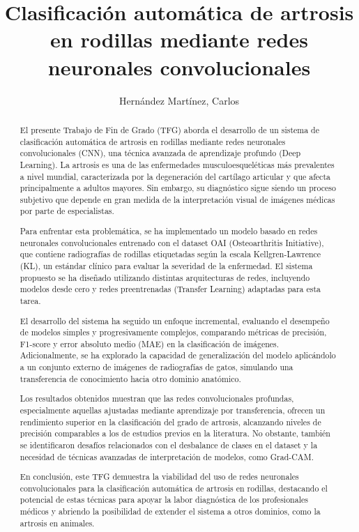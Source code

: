 \documentclass[11pt,spanish,listoffigures,listoftables]{tfgetsinf}
\title{Clasificación automática de artrosis en rodillas mediante redes neuronales convolucionales}
\author{Hernández Martínez, Carlos}
\begin{document}

\begin{abstract}

El presente Trabajo de Fin de Grado (TFG) aborda el desarrollo de un sistema de clasificación automática de artrosis en rodillas mediante redes neuronales convolucionales (CNN), una técnica avanzada de aprendizaje profundo (Deep Learning). La artrosis es una de las enfermedades musculoesqueléticas más prevalentes a nivel mundial, caracterizada por la degeneración del cartílago articular y que afecta principalmente a adultos mayores. Sin embargo, su diagnóstico sigue siendo un proceso subjetivo que depende en gran medida de la interpretación visual de imágenes médicas por parte de especialistas.

Para enfrentar esta problemática, se ha implementado un modelo basado en redes neuronales convolucionales entrenado con el dataset OAI (Osteoarthritis Initiative), que contiene radiografías de rodillas etiquetadas según la escala Kellgren-Lawrence (KL), un estándar clínico para evaluar la severidad de la enfermedad. El sistema propuesto se ha diseñado utilizando distintas arquitecturas de redes, incluyendo modelos desde cero y redes preentrenadas (Transfer Learning) adaptadas para esta tarea.

El desarrollo del sistema ha seguido un enfoque incremental, evaluando el desempeño de modelos simples y progresivamente complejos, comparando métricas de precisión, F1-score y error absoluto medio (MAE) en la clasificación de imágenes. Adicionalmente, se ha explorado la capacidad de generalización del modelo aplicándolo a un conjunto externo de imágenes de radiografías de gatos, simulando una transferencia de conocimiento hacia otro dominio anatómico.

Los resultados obtenidos muestran que las redes convolucionales profundas, especialmente aquellas ajustadas mediante aprendizaje por transferencia, ofrecen un rendimiento superior en la clasificación del grado de artrosis, alcanzando niveles de precisión comparables a los de estudios previos en la literatura. No obstante, también se identificaron desafíos relacionados con el desbalance de clases en el dataset y la necesidad de técnicas avanzadas de interpretación de modelos, como Grad-CAM.

En conclusión, este TFG demuestra la viabilidad del uso de redes neuronales convolucionales para la clasificación automática de artrosis en rodillas, destacando el potencial de estas técnicas para apoyar la labor diagnóstica de los profesionales médicos y abriendo la posibilidad de extender el sistema a otros dominios, como la artrosis en animales.

\end{abstract}
\end{document}
